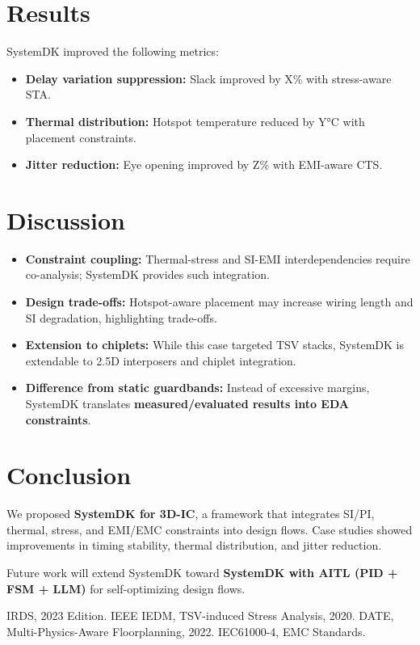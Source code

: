 \documentclass[conference]{IEEEtran}
\begin{document}
\section{Results}
SystemDK improved the following metrics:
\begin{itemize}
  \item \textbf{Delay variation suppression:} Slack improved by X\% with stress-aware STA.
  \item \textbf{Thermal distribution:} Hotspot temperature reduced by Y°C with placement constraints.
  \item \textbf{Jitter reduction:} Eye opening improved by Z\% with EMI-aware CTS.
\end{itemize}

\section{Discussion}
\begin{itemize}
  \item \textbf{Constraint coupling:} Thermal-stress and SI-EMI interdependencies require co-analysis; SystemDK provides such integration.
  \item \textbf{Design trade-offs:} Hotspot-aware placement may increase wiring length and SI degradation, highlighting trade-offs.
  \item \textbf{Extension to chiplets:} While this case targeted TSV stacks, SystemDK is extendable to 2.5D interposers and chiplet integration.
  \item \textbf{Difference from static guardbands:} Instead of excessive margins, SystemDK translates \textbf{measured/evaluated results into EDA constraints}.
\end{itemize}

\section{Conclusion}
We proposed \textbf{SystemDK for 3D-IC}, a framework that integrates SI/PI, thermal, stress, and EMI/EMC constraints into design flows.  
Case studies showed improvements in timing stability, thermal distribution, and jitter reduction.  

Future work will extend SystemDK toward \textbf{SystemDK with AITL (PID + FSM + LLM)} for self-optimizing design flows.

\begin{thebibliography}{1}
 IRDS, 2023 Edition.
 IEEE IEDM, TSV-induced Stress Analysis, 2020.
 DATE, Multi-Physics-Aware Floorplanning, 2022.
 IEC61000-4, EMC Standards.
\end{thebibliography}
\end{document}

